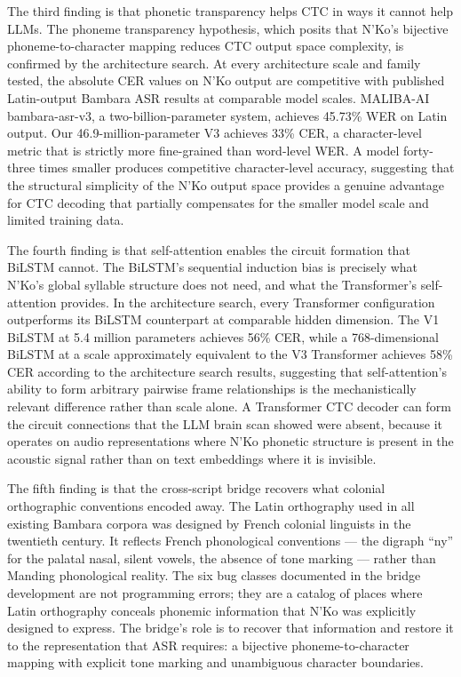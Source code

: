 \documentclass[11pt]{article}
\newcommand{\nko}{N'Ko}
\begin{document}
The third finding is that phonetic transparency helps CTC in ways it cannot help LLMs. The phoneme transparency hypothesis, which posits that \nko{}'s bijective phoneme-to-character mapping reduces CTC output space complexity, is confirmed by the architecture search. At every architecture scale and family tested, the absolute CER values on \nko{} output are competitive with published Latin-output Bambara ASR results at comparable model scales. MALIBA-AI bambara-asr-v3, a two-billion-parameter system, achieves 45.73\% WER on Latin output. Our 46.9-million-parameter V3 achieves 33\% CER, a character-level metric that is strictly more fine-grained than word-level WER. A model forty-three times smaller produces competitive character-level accuracy, suggesting that the structural simplicity of the \nko{} output space provides a genuine advantage for CTC decoding that partially compensates for the smaller model scale and limited training data.

The fourth finding is that self-attention enables the circuit formation that BiLSTM cannot. The BiLSTM's sequential induction bias is precisely what \nko{}'s global syllable structure does not need, and what the Transformer's self-attention provides. In the architecture search, every Transformer configuration outperforms its BiLSTM counterpart at comparable hidden dimension. The V1 BiLSTM at 5.4 million parameters achieves 56\% CER, while a 768-dimensional BiLSTM at a scale approximately equivalent to the V3 Transformer achieves 58\% CER according to the architecture search results, suggesting that self-attention's ability to form arbitrary pairwise frame relationships is the mechanistically relevant difference rather than scale alone. A Transformer CTC decoder can form the circuit connections that the LLM brain scan showed were absent, because it operates on audio representations where \nko{} phonetic structure is present in the acoustic signal rather than on text embeddings where it is invisible.

The fifth finding is that the cross-script bridge recovers what colonial orthographic conventions encoded away. The Latin orthography used in all existing Bambara corpora was designed by French colonial linguists in the twentieth century. It reflects French phonological conventions --- the digraph ``ny'' for the palatal nasal, silent vowels, the absence of tone marking --- rather than Manding phonological reality. The six bug classes documented in the bridge development are not programming errors; they are a catalog of places where Latin orthography conceals phonemic information that \nko{} was explicitly designed to express. The bridge's role is to recover that information and restore it to the representation that ASR requires: a bijective phoneme-to-character mapping with explicit tone marking and unambiguous character boundaries.
\end{document}
